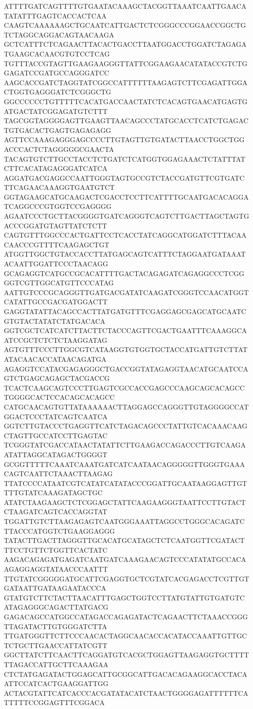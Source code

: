 ATTTTGATCAGTTTTGTGAATACAAAGCTACGGTTAAATCAATTGAACATATATTTGAGTCACCACTCAA
CAAGTCAAAAAAGCTGCAATCATTGACTCTCGGGCCCGGAACCGGCTGTCTAGGCAGGACAGTAACAAGA
GCTCATTTCTCAGAACTTACACTGACCTTAATGGACCTGGATCTAGAGATGAAGCACAACGTGTCCTCAG
TGTTTACCGTAGTTGAAGAAGGGTTATTCGGAAGAACATATACCGTCTGGAGATCCGATGCCAGGGATCC
AAGCACCGATCTAGGTATCGGCCATTTTTTAAGAGTCTTCGAGATTGGACTGGTGAGGGATCTCGGGCTG
GGCCCCCCTGTTTTTCACATGACCAACTATCTCACAGTGAACATGAGTGATGACTATCGGAGATGTCTTT
TAGCGGTAGGGGAGTTGAAGTTAACAGCCCTATGCACCTCATCTGAGACTGTGACACTGAGTGAGAGAGG
AGTTCCAAAGAGGGAGCCCCTTGTAGTTGTGATACTTAACCTGGCTGGACCCACTCTAGGGGGCGAACTA
TACAGTGTCTTGCCTACCTCTGATCTCATGGTGGAGAAACTCTATTTATCTTCACATAGAGGGATCATCA
AGGATGACGAGGCCAATTGGGTAGTGCCGTCTACCGATGTTCGTGATCTTCAGAACAAAGGTGAATGTCT
GGTAGAAGCATGCAAGACTCGACCTCCTTCATTTTGCAATGACACAGGATCAGGCCCGTGGTCCGAGGGG
AGAATCCCTGCTTACGGGGTGATCAGGGTCAGTCTTGACTTAGCTAGTGACCCGGATGTAGTTATCTCTT
CAGTGTTTGGCCCACTGATTCCTCACCTATCAGGCATGGATCTTTACAACAACCCGTTTTCAAGAGCTGT
ATGGTTGGCTGTACCACCTTATGAGCAGTCATTTCTAGGAATGATAAATACAATTGGATTCCCTAACAGG
GCAGAGGTCATGCCGCACATTTTGACTACAGAGATCAGAGGCCCTCGGGGTCGTTGGCATGTTCCCATAG
AATTGTCCCGCAGGGTTGATGACGATATCAAGATCGGGTCCAACATGGTCATATTGCCGACGATGGACTT
GAGGTATATTACAGCCACTTATGATGTTTCGAGGAGCGAGCATGCAATCGTGTACTATATCTATGACACA
GGTCGCTCATCATCTTACTTCTACCCAGTTCGACTGAATTTCAAAGGCAATCCGCTCTCTCTAAGGATAG
AGTGTTTCCCTTGGCGTCATAAGGTGTGGTGCTACCATGATTGTCTTATATACAACACCATAACAGATGA
AGAGGTCCATACGAGAGGGCTGACCGGTATAGAGGTAACATGCAATCCAGTCTGAGCAGAGCTACGACCG
TCACTCAAGCAGTCCCTTGAGTCGCCACCGAGCCCAAGCAGCACAGCCTGGGGCACTCCACAGCACAGCC
CATGCAACAGTGTTATAAAAAACTTAGGAGCCAGGGTTGTAGGGGCCATGGACTCCCTATCAGTCAATCA
GGTCTTGTACCCTGAGGTTCATCTAGACAGCCCTATTGTCACAAACAAGCTAGTTGCCATCCTTGAGTAC
TCGGGTATCGACCATAACTATATTCTTGAAGACCAGACCCTTGTCAAGAATATTAGGCATAGACTGGGGT
GCGGTTTTTCAAATCAAATGATCATCAATAACAGGGGGTTGGGTGAAACAGTCAATTCTAAACTTAAGAG
TTATCCCCATAATCGTCATATCATATACCCGGATTGCAATAAGGAGTTGTTTTGTATCAAAGATAGCTGC
ATATCTAAGAAGCTCTCGGAGCTATTCAAGAAGGGTAATTCCTTGTACTCTAAGATCAGTCACCAGGTAT
TGGATTGTCTTAAGAGAGTCAATGGGAAATTAGGCCTGGGCACAGATCTTACCCATGGTCTGAAGGAGGG
TATACTTGACTTAGGGTTGCACATGCATAGCTCTCAATGGTTCGATACTTTCCTGTTCTGGTTCACTATC
AAGACAGAGATGAGATCAATGATCAAAGAACAGTCCCATATATGCCACAAGAGGAGGTATAACCCAATTT
TTGTATCGGGGGATGCATTCGAGGTGCTCGTATCACGAGACCTCGTTGTGATAATTGATAAGAATACCCA
GTATGTCTTCTACTTAACATTTGAGCTGGTCCTTATGTATTGTGATGTCATAGAGGGCAGACTTATGACG
GAGACAGCCATGGCCATAGACCAGAGATACTCAGAACTTCTAAACCGGGTTAGATACTTGTGGGATCTTA
TTGATGGGTTCTTCCCAACACTAGGCAACACCACATACCAAATTGTTGCTCTGCTTGAACCATTATCGTT
GGCTTATCTTCAACTTCAGGATGTCACGCTGGAGTTAAGAGGTGCTTTTTTAGACCATTGCTTCAAAGAA
CTCTATGAGATACTGGAGCATTGCGGCATTGACACAGAAGGCACCTACAATTCCATCACTGAAGGATTGG
ACTACGTATTCATCACCCACGATATACATCTAACTGGGGAGATTTTTTCATTTTTCCGGAGTTTCGGACA
